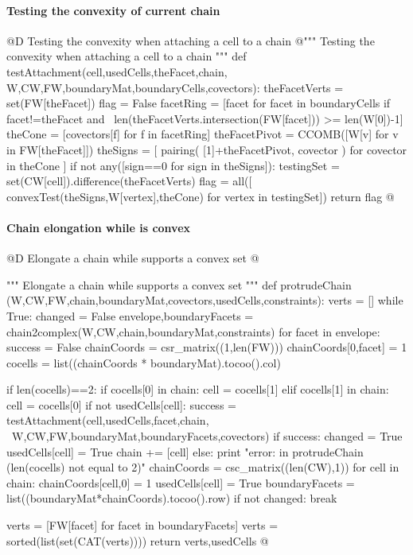 \documentclass[11pt,oneside]{article}	%
\begin{document}
\paragraph{Testing the convexity of current chain}
@D Testing the convexity when attaching a cell to a chain
@{""" Testing the convexity when attaching a cell to a chain """
def testAttachment(cell,usedCells,theFacet,chain,
					W,CW,FW,boundaryMat,boundaryCells,covectors):
	theFacetVerts = set(FW[theFacet])
	flag = False
	facetRing = [facet for facet in boundaryCells if facet!=theFacet and \
				 len(theFacetVerts.intersection(FW[facet])) >= len(W[0])-1]
	theCone = [covectors[f] for f in facetRing]
	theFacetPivot = CCOMB([W[v] for v in FW[theFacet]])
	theSigns = [ pairing( [1]+theFacetPivot, covector ) for covector in theCone ]
	if not any([sign==0 for sign in theSigns]):
		testingSet = set(CW[cell]).difference(theFacetVerts)
		flag = all([ convexTest(theSigns,W[vertex],theCone) for vertex in testingSet])
	return flag
@}

\paragraph{Chain elongation while is convex}

@D Elongate a chain while supports a convex set
@{""" Elongate a chain while supports a convex set """
def protrudeChain (W,CW,FW,chain,boundaryMat,covectors,usedCells,constraints):
	verts = []
	while True:	
		changed = False
		envelope,boundaryFacets = chain2complex(W,CW,chain,boundaryMat,constraints)
		for facet in envelope:
			success = False
			chainCoords = csr_matrix((1,len(FW)))
			chainCoords[0,facet] = 1
			cocells = list((chainCoords * boundaryMat).tocoo().col)
			
			if len(cocells)==2:
				if cocells[0] in chain: cell = cocells[1]
				elif cocells[1] in chain: cell = cocells[0]
				if not usedCells[cell]:
					success = testAttachment(cell,usedCells,facet,chain, \
								W,CW,FW,boundaryMat,boundaryFacets,covectors)
				if success: 
					changed = True
					usedCells[cell] = True
					chain += [cell]
			else: print "error: in protrudeChain (len(cocells) not equal to 2)"
			chainCoords = csc_matrix((len(CW),1))
			for cell in chain: 
				chainCoords[cell,0] = 1
				usedCells[cell] = True
			boundaryFacets = list((boundaryMat*chainCoords).tocoo().row)
		if not changed: break		
			
	verts = [FW[facet] for facet in boundaryFacets]
	verts = sorted(list(set(CAT(verts))))
	return verts,usedCells
@}
\end{document}
